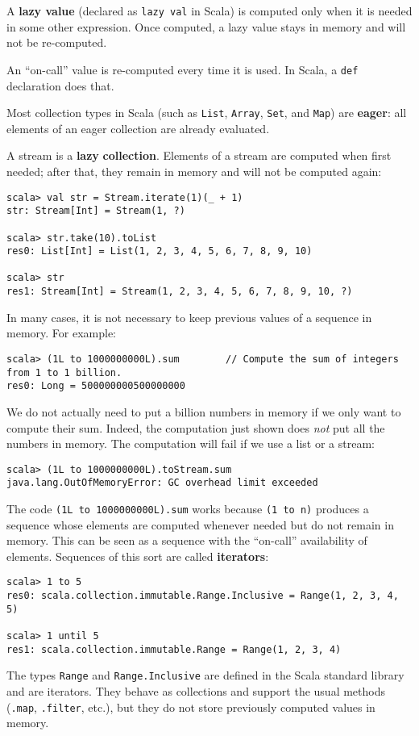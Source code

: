 A \textbf{lazy value} (declared as \lstinline!lazy val!
in Scala) is computed only when it is needed in some other expression.
Once computed, a lazy value stays in memory and will not be re-computed.

An ``on-call'' value is re-computed every
time it is used. In Scala, a \lstinline!def! declaration does that.

Most collection types in Scala (such as \lstinline!List!, \lstinline!Array!,
\lstinline!Set!, and \lstinline!Map!) are \textbf{eager}:
all elements of an eager collection are already evaluated.

A stream is a \textbf{lazy} \textbf{collection}.
Elements of a stream are computed when first needed; after that, they
remain in memory and will not be computed again:
\begin{lstlisting}
scala> val str = Stream.iterate(1)(_ + 1)
str: Stream[Int] = Stream(1, ?)

scala> str.take(10).toList
res0: List[Int] = List(1, 2, 3, 4, 5, 6, 7, 8, 9, 10)

scala> str
res1: Stream[Int] = Stream(1, 2, 3, 4, 5, 6, 7, 8, 9, 10, ?)
\end{lstlisting}

In many cases, it is not necessary to keep previous values of a sequence
in memory. For example:

\begin{lstlisting}
scala> (1L to 1000000000L).sum        // Compute the sum of integers from 1 to 1 billion.
res0: Long = 500000000500000000
\end{lstlisting}
We do not actually need to put a billion numbers in memory if we only
want to compute their sum. Indeed, the computation just shown does
\emph{not} put all the numbers in memory. The computation will fail
if we use a list or a stream: 
\begin{lstlisting}
scala> (1L to 1000000000L).toStream.sum
java.lang.OutOfMemoryError: GC overhead limit exceeded
\end{lstlisting}

The code \lstinline!(1L to 1000000000L).sum! works because \lstinline!(1 to n)!
produces a sequence whose elements are computed whenever needed but
do not remain in memory. This can be seen as a sequence with the ``on-call''
availability of elements. Sequences of this sort are called \textbf{iterators}:
\begin{lstlisting}
scala> 1 to 5
res0: scala.collection.immutable.Range.Inclusive = Range(1, 2, 3, 4, 5)

scala> 1 until 5
res1: scala.collection.immutable.Range = Range(1, 2, 3, 4)
\end{lstlisting}
The types \lstinline!Range! and \lstinline!Range.Inclusive! are
defined in the Scala standard library and are iterators. They behave
as collections and support the usual methods (\lstinline!.map!, \lstinline!.filter!,
etc.), but they do not store previously computed values in memory.

